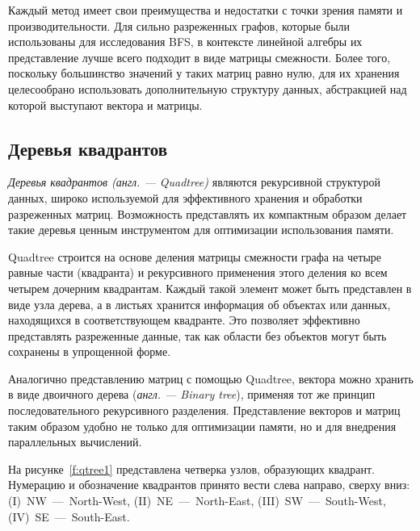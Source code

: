 Каждый метод имеет свои преимущества и недостатки с точки зрения памяти и производительности. Для сильно разреженных графов, которые были использованы для исследования BFS, в контексте линейной алгебры их представление лучше всего подходит в виде матрицы смежности. Более того, поскольку большинство значений у таких матриц равно нулю, для их хранения целесообрано использовать дополнительную структуру данных, абстракцией над которой выступают вектора и матрицы.



\subsection{Деревья квадрантов}
\textit{Деревья квадрантов (англ. --- Quadtree)} являются рекурсивной структурой данных, широко используемой для эффективного хранения и обработки разреженных матриц. Возможность представлять их компактным образом делает такие деревья ценным инструментом для оптимизации использования памяти.

Quadtree строится на основе деления матрицы смежности графа на четыре равные части (квадранта) и рекурсивного применения этого деления ко всем четырем дочерним квадрантам. Каждый такой элемент может быть представлен в виде узла дерева, а в листьях хранится информация об объектах или данных, находящихся в соответствующем квадранте. Это позволяет эффективно представлять разреженные данные, так как области без объектов могут быть сохранены в упрощенной форме. 

Аналогично представлению матриц с помощью Quadtree, вектора можно хранить в виде двоичного дерева (\textit{англ. --- Binary tree}), применяя тот же принцип последовательного рекурсивного разделения. Представление векторов и матриц таким образом удобно не только для оптимизации памяти, но и для внедрения параллельных вычислений.

На рисунке~\ref{f:qtree1} представлена четверка узлов, образующих квадрант. Нумерацию и обозначение квадрантов принято вести слева направо, сверху вниз: (I)~NW~---~North-West, (II)~NE~---~North-East, (III)~SW~---~South-West, (IV)~SE~---~South-East.

\begin{center}
\begin{figure}[h]
\centering
{}
\end{figure}
\label{f:qmatrix}
\end{center}

